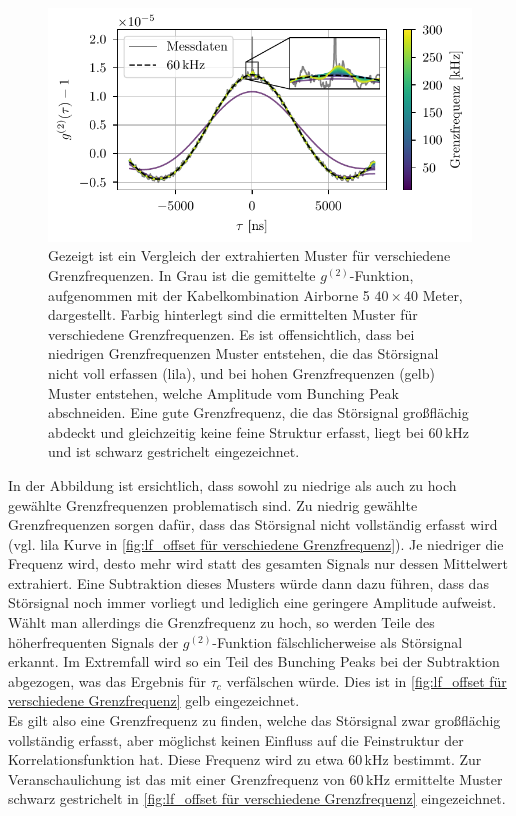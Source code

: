 \begin{figure}[h]
    \centering
    \includegraphics{images/Analysis/lf_offset.pdf}
    \caption{Gezeigt ist ein Vergleich der extrahierten Muster für verschiedene Grenzfrequenzen. In Grau ist die gemittelte $g^{(2)}$-Funktion, aufgenommen mit der Kabelkombination Airborne 5 $40\times 40$ Meter, dargestellt. Farbig hinterlegt sind die ermittelten Muster für verschiedene Grenzfrequenzen. Es ist offensichtlich, dass bei niedrigen Grenzfrequenzen Muster entstehen, die das Störsignal nicht voll erfassen (lila), und bei hohen Grenzfrequenzen (gelb) Muster entstehen, welche Amplitude vom Bunching Peak abschneiden. Eine gute Grenzfrequenz, die das Störsignal großflächig abdeckt und gleichzeitig keine feine Struktur erfasst, liegt bei 60\,kHz und ist schwarz gestrichelt eingezeichnet.}
    \label{fig:lf_offset für verschiedene Grenzfrequenz}
\end{figure}
In der Abbildung ist ersichtlich, dass sowohl zu niedrige als auch zu hoch gewählte Grenzfrequenzen problematisch sind. 
Zu niedrig gewählte Grenzfrequenzen sorgen dafür, dass das Störsignal nicht vollständig erfasst wird (vgl. lila Kurve in \autoref{fig:lf_offset für verschiedene Grenzfrequenz}). 
Je niedriger die Frequenz wird, desto mehr wird statt des gesamten Signals nur dessen Mittelwert extrahiert. 
Eine Subtraktion dieses Musters würde dann dazu führen, dass das Störsignal noch immer vorliegt und lediglich eine geringere Amplitude aufweist. 
Wählt man allerdings die Grenzfrequenz zu hoch, so werden Teile des höherfrequenten Signals der $g^{(2)}$-Funktion fälschlicherweise als Störsignal erkannt. 
Im Extremfall wird so ein Teil des Bunching Peaks bei der Subtraktion abgezogen, was das Ergebnis für $\tau_c$ verfälschen würde. 
Dies ist in \autoref{fig:lf_offset für verschiedene Grenzfrequenz} gelb eingezeichnet. \\
Es gilt also eine Grenzfrequenz zu finden, welche das Störsignal zwar großflächig vollständig erfasst, aber möglichst keinen Einfluss auf die Feinstruktur der Korrelationsfunktion hat. 
Diese Frequenz wird zu etwa 60\,kHz bestimmt. 
Zur Veranschaulichung ist das mit einer Grenzfrequenz von 60\,kHz ermittelte Muster schwarz gestrichelt in \autoref{fig:lf_offset für verschiedene Grenzfrequenz} eingezeichnet. \\

